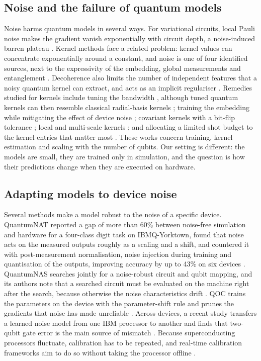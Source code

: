 \documentclass[10pt,conference]{IEEEtran}
\begin{document}
\subsection{Noise and the failure of quantum models}
Noise harms quantum models in several ways. For variational circuits, local Pauli noise makes
the gradient vanish exponentially with circuit depth, a noise-induced barren plateau
\cite{wang2021nibp}. Kernel methods face a related problem: kernel values can concentrate
exponentially around a constant, and noise is one of four identified sources, next to the
expressivity of the embedding, global measurements and entanglement
\cite{thanasilp2024concentration}. Decoherence also limits the number of independent features
that a noisy quantum kernel can extract, and acts as an implicit regulariser
\cite{heyraud2022noisykernels}. Remedies studied for kernels include tuning the bandwidth
\cite{shaydulin2022bandwidth}, although tuned quantum kernels can then resemble classical
radial-basis kernels \cite{bandwidth2025similarity}; training the embedding while mitigating
the effect of device noise \cite{hubregtsen2022embedding}; covariant kernels with a bit-flip
tolerance \cite{covariant2025concentration}; local and multi-scale kernels
\cite{localkernels2026}; and allocating a limited shot budget to the kernel entries that matter
most \cite{aqka2026}. These works concern training, kernel estimation and scaling with the
number of qubits. Our setting is different: the models are small, they are trained only in
simulation, and the question is how their predictions change when they are executed on hardware.

\subsection{Adapting models to device noise}
Several methods make a model robust to the noise of a specific device. QuantumNAT reported a gap
of more than 60\% between noise-free simulation and hardware for a four-class digit task on
IBMQ-Yorktown, found that noise acts on the measured outputs roughly as a scaling and a shift,
and countered it with post-measurement normalisation, noise injection during training and
quantisation of the outputs, improving accuracy by up to 43\% on six devices
\cite{wang2022quantumnat}. QuantumNAS searches jointly for a noise-robust circuit and qubit
mapping, and its authors note that a searched circuit must be evaluated on the machine right
after the search, because otherwise the noise characteristics drift \cite{wang2022quantumnas}.
QOC trains the parameters on the device with the parameter-shift rule and prunes the gradients
that noise has made unreliable \cite{wang2022qoc}. Across devices, a recent study transfers a
learned noise model from one IBM processor to another and finds that two-qubit gate error is
the main source of mismatch \cite{farib2026crossdevice}. Because superconducting processors
fluctuate, calibration has to be repeated, and real-time calibration frameworks aim to do so
without taking the processor offline \cite{realtimecal2023}.
\end{document}
